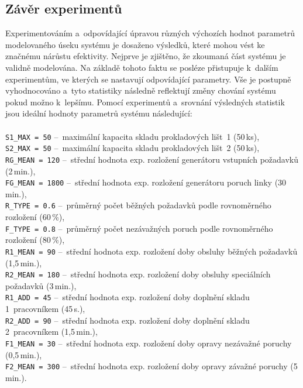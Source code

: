 \documentclass[a4paper, 11pt]{article}
\begin{document}
\subsection{Závěr experimentů}

Experimentováním a~odpovídající úpravou různých výchozích hodnot parametrů modelovaného úseku systému je dosaženo výsledků, které mohou vést ke značnému nárůstu efektivity.
Nejprve je zjištěno, že zkoumaná část systému je validně modelována.
Na základě tohoto faktu se posléze přistupuje k~dalším experimentům, ve kterých se nastavují odpovídající parametry.
Vše je postupně vyhodnocováno a~tyto statistiky následně reflektují změny chování systému pokud možno k~lepšímu.
Pomocí experimentů a~srovnání výsledných statistik jsou ideální hodnoty parametrů systému následující:\\ \\
\texttt{S1\_MAX = 50} --~maximální kapacita skladu prokladových lišt~1 (50\,ks),\\
\texttt{S2\_MAX = 50} --~maximální kapacita skladu prokladových lišt~2 (50\,ks),\\
\texttt{RG\_MEAN = 120} --~střední hodnota exp. rozložení generátoru vstupních požadavků (2\,min.),\\
\texttt{FG\_MEAN = 1800} --~střední hodnota exp. rozložení generátoru poruch linky (30\,min.),\\
\texttt{R\_TYPE = 0.6} --~průměrný počet běžných požadavků podle rovnoměrného rozložení (60\,\%),\\
\texttt{F\_TYPE = 0.8} --~průměrný počet nezávažných poruch podle rovnoměrného rozložení (80\,\%),\\
\texttt{R1\_MEAN = 90} --~střední hodnota exp. rozložení doby obsluhy běžných požadavků (1,5\,min.),\\
\texttt{R2\_MEAN = 180} --~střední hodnota exp. rozložení doby obsluhy speciálních požadavků (3\,min.),\\
\texttt{R1\_ADD = 45} --~střední hodnota exp. rozložení doby doplnění skladu 1~pracovníkem (45\,s.),\\
\texttt{R2\_ADD = 90} --~střední hodnota exp. rozložení doby doplnění skladu 2~pracovníkem (1,5\,min.),\\
\texttt{F1\_MEAN = 30} --~střední hodnota exp. rozložení doby opravy nezávažné poruchy (0,5\,min.),\\
\texttt{F2\_MEAN = 300} --~střední hodnota exp. rozložení doby opravy závažné poruchy (5\,min.).

\newpage
\end{document}
